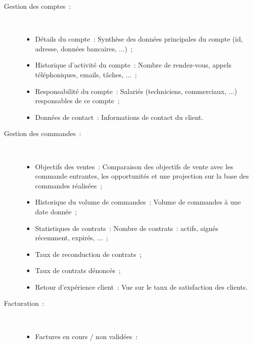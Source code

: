         \begin{description}
            \item[Gestion des comptes~:] ~ \\
                \begin{itemize}
                    \item Détails du compte~: Synthèse des données principales du compte (id, adresse, données bancaires, ...)~;
                    \item Historique d'activité du compte~: Nombre de rendez-vous, appels téléphoniques, emails, tâches, ...~;
                    \item Responsabilité du compte~: Salariés (techniciens, commerciaux, ...) responsables de ce compte~;
                    \item Données de contact~: Informations de contact du client.
                \end{itemize}

            \item[Gestion des commandes~:] ~ \\
                \begin{itemize}
                    \item Objectifs des ventes~: Comparaison des objectifs de vente avec les commande entrantes, les opportunités et une projection sur la base des commandes réalisées~;
                    \item Historique du volume de commandes~: Volume de commandes à une date donnée~;
                    \item Statistiques de contrats~: Nombre de contrats~: actifs, signés récemment, expirés, ...~;
                    \item Taux de reconduction de contrats~;
                    \item Taux de contrats dénoncés~;
                    \item Retour d'expérience client~: Vue sur le taux de satisfaction des clients.
                \end{itemize}

            \item[Facturation~:] ~ \\
                \begin{itemize}
                    \item Factures en cours / non validées~:
                \end{itemize}

        \end{description}



